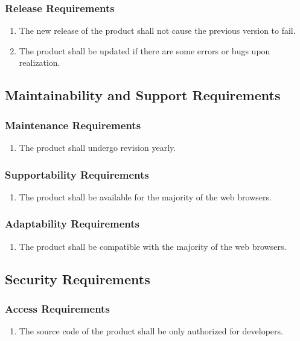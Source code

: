 \documentclass[12pt, titlepage]{article}
\begin{document}
\subsubsection{Release Requirements}
\begin{enumerate}
    \item The new release of the product shall not cause the previous version to fail.
    \item The product shall be updated if there are some errors or bugs upon realization.
\end{enumerate}

\subsection{Maintainability and Support Requirements}
\subsubsection{Maintenance Requirements}
\begin{enumerate}
    \item The product shall undergo revision yearly.
\end{enumerate}

\subsubsection{Supportability Requirements}
\begin{enumerate}
    \item The product shall be available for the majority of the web browsers.
\end{enumerate}

\subsubsection{Adaptability Requirements}
\begin{enumerate}
    \item The product shall be compatible with the majority of the web browsers.
\end{enumerate}

\subsection{Security Requirements}
\subsubsection{Access Requirements}
\begin{enumerate}
    \item The source code of the product shall be only authorized for developers.
\end{enumerate}
\end{document}
